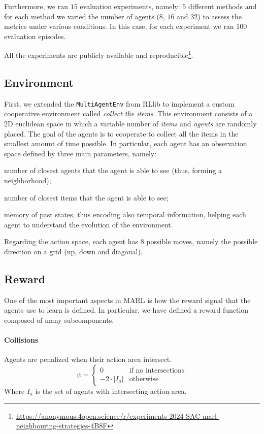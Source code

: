 \documentclass[sigconf]{acmart}
\begin{document}
Furthermore, we ran $15$ evaluation experiments, namely: $5$ different methods and for each method 
  we varied the number of agents ($8$, $16$ and $32$) to assess the metrics under various conditions.
  In this case, for each experiment we ran $100$ evaluation episodes.

All the experiments are publicly available and reproducible\footnote{\url{https://anonymous.4open.science/r/experiments-2024-SAC-marl-neighbouring-strategies-4B8F}}.

\subsection{Environment} 
First, we extended the \texttt{MultiAgentEnv} from RLlib to implement a custom cooperative environment 
  called \emph{collect the items}. %
%
This environment consists of a 2D euclidean space in which a variable number of \emph{items} and \emph{agents} 
 are randomly placed.
%
The goal of the agents is to cooperate to collect all the items in the smallest amount of time possible. 
%
In particular, each agent has an observation space defined by three main parameters, namely: 
\begin{enumerate*}[label=(\roman*)]
  \item number of closest agents that the agent is able to see (thus, forming a neighborhood);
  \item number of closest items that the agent is able to see;
  \item memory of past states, thus encoding also temporal information, helping each agent to understand 
    the evolution of the environment.
\end{enumerate*} 
%
Regarding the action space, each agent has $8$ possible moves, namely the possible direction on a grid 
  (up, down and diagonal).


\subsection{Reward}
One of the most important aspects in MARL is how the reward signal that the agents use to 
  learn is defined.
%
In particular, we have defined a reward function composed of many subcomponents.

\paragraph{Collisions} Agents are penalized when their action area intersect. 
  \[ \psi = \begin{cases}
    0 & \text{if no intersections} \\
    -2 \cdot |I_a| & \text{otherwise}
  \end{cases} \]
  Where $I_a$ is the set of agents with intersecting action area.
\end{document}
